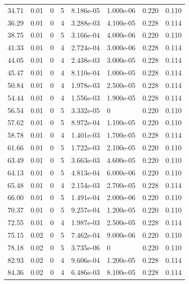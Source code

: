\documentclass[preview]{standalone}
\begin{document}
{{\begin{tabular}{L{1.2cm}C{1.2cm} C{0.3cm}C{0.5cm} C{1.4cm}C{1.4cm} C{1.4cm}C{1.4cm}}
  34.71  &  0.01  & 0     &  5 &  8.186e-05  & 1.000e-06  & 0.220 &  0.110   \\ 
  36.29  &  0.01  & 0     &  4 &  3.288e-03  & 4.100e-05  & 0.228 &  0.114   \\ 
  38.75  &  0.01  & 0     &  5 &  3.166e-04  & 4.000e-06  & 0.220 &  0.110   \\ 
  41.33  &  0.01  & 0     &  4 &  2.724e-04  & 3.000e-06  & 0.228 &  0.114   \\ 
  44.05  &  0.01  & 0     &  4 &  2.438e-03  & 3.000e-05  & 0.228 &  0.114   \\ 
  45.47  &  0.01  & 0     &  4 &  8.110e-04  & 1.000e-05  & 0.228 &  0.114   \\ 
  50.84  &  0.01  & 0     &  4 &  1.978e-03  & 2.500e-05  & 0.228 &  0.114   \\ 
  54.44  &  0.01  & 0     &  4 &  1.556e-03  & 1.900e-05  & 0.228 &  0.114   \\ 
  56.54  &  0.01  & 0     &  5 &  3.332e-05  & 0  & 0.220 &  0.110   \\ 
  57.62  &  0.01  & 0     &  5 &  8.972e-04  & 1.100e-05  & 0.220 &  0.110   \\ 
  58.78  &  0.01  & 0     &  4 &  1.401e-03  & 1.700e-05  & 0.228 &  0.114   \\ 
  61.66  &  0.01  & 0     &  5 &  1.722e-03  & 2.100e-05  & 0.220 &  0.110   \\ 
  63.49  &  0.01  & 0     &  5 &  3.663e-03  & 4.600e-05  & 0.220 &  0.110   \\ 
  64.13  &  0.01  & 0     &  5 &  4.813e-04  & 6.000e-06  & 0.220 &  0.110   \\ 
  65.48  &  0.01  & 0     &  4 &  2.154e-03  & 2.700e-05  & 0.228 &  0.114   \\ 
  66.00  &  0.01  & 0     &  5 &  1.491e-04  & 2.000e-06  & 0.220 &  0.110   \\ 
  70.37  &  0.01  & 0     &  5 &  9.257e-04  & 1.200e-05  & 0.220 &  0.110   \\ 
  72.55  &  0.01  & 0     &  4 &  1.987e-03  & 2.500e-05  & 0.228 &  0.114   \\ 
  75.15  &  0.02  & 0     &  5 &  7.462e-04  & 9.000e-06  & 0.220 &  0.110   \\ 
  78.18  &  0.02  & 0     &  5 &  3.735e-06  & 0  & 0.220 &  0.110   \\ 
  82.93  &  0.02  & 0     &  4 &  9.606e-04  & 1.200e-05  & 0.228 &  0.114   \\ 
  84.36  &  0.02  & 0     &  4 &  6.486e-03  & 8.100e-05  & 0.228 &  0.114   \\ 

\end{tabular}}}
\end{document}

